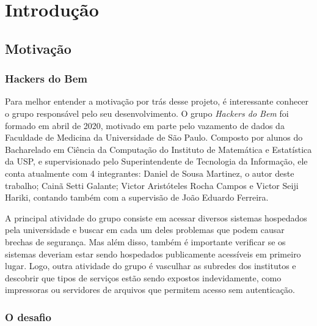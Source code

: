 
\chapter{Introdução}
\label{cap:introducao}



\section{Motivação}

\subsection{Hackers do Bem}
Para melhor entender a motivação por trás desse projeto, é interessante conhecer o grupo responsável pelo seu desenvolvimento. O grupo \textit{Hackers do Bem} foi formado em abril de 2020, motivado em parte pelo vazamento de dados da Faculdade de Medicina da Universidade de São Paulo. Composto por alunos do Bacharelado em Ciência da Computação do Instituto de Matemática e Estatística da USP, e supervisionado pelo Superintendente de Tecnologia da Informação, ele conta atualmente com 4 integrantes: Daniel de Sousa Martinez, o autor deste trabalho; Cainã Setti Galante; Victor Aristóteles Rocha Campos e Victor Seiji Hariki, contando também com a supervisão de João Eduardo Ferreira.

A principal atividade do grupo consiste em acessar diversos sistemas hospedados pela universidade e buscar em cada um deles problemas que podem causar brechas de segurança. Mas além disso, também é importante verificar se os sistemas deveriam estar sendo hospedados publicamente acessíveis em primeiro lugar. Logo, outra atividade do grupo é vasculhar as subredes
dos institutos e descobrir que tipos de serviços estão sendo expostos indevidamente, como impressoras ou servidores de arquivos que permitem acesso sem autenticação. 


% 
\subsection{O desafio}


